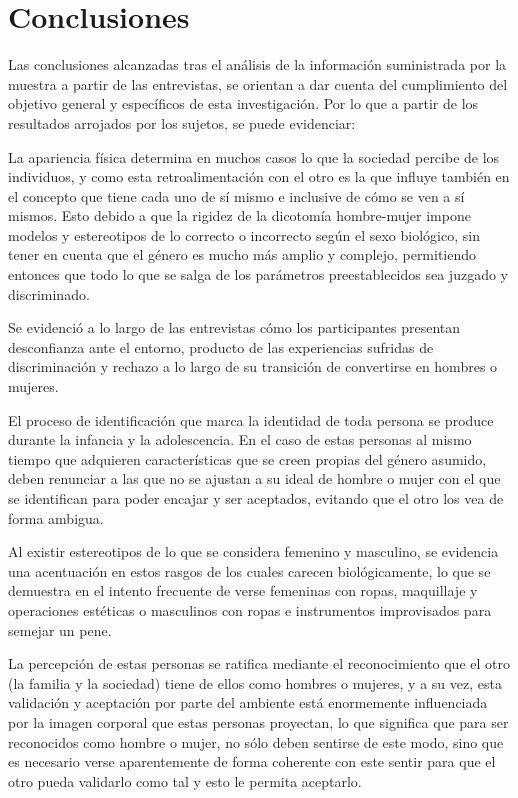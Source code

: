 \chapter{Conclusiones}\label{ch:conclusion}

Las conclusiones alcanzadas tras el análisis de la información suministrada por
la muestra a partir de las entrevistas, se orientan a dar cuenta del
cumplimiento del objetivo general y específicos de esta investigación. Por lo
que a partir de los resultados arrojados por los sujetos, se puede evidenciar:

La apariencia física determina en muchos casos lo que la sociedad percibe de los
individuos, y como esta retroalimentación con el otro es la que influye también
en el concepto que tiene cada uno de sí mismo e inclusive de cómo se ven a sí
mismos. Esto debido a que la rigidez de la dicotomía hombre-mujer impone modelos
y estereotipos de lo correcto o incorrecto según el sexo biológico, sin tener en
cuenta que el género es mucho más amplio y complejo, permitiendo entonces que
todo lo que se salga de los parámetros preestablecidos sea juzgado y
discriminado.

Se evidenció a lo largo de las entrevistas cómo los participantes presentan
desconfianza ante el entorno, producto de las experiencias sufridas de
discriminación y rechazo a lo largo de su transición de convertirse en hombres o
mujeres.

El proceso de identificación que marca la identidad de toda persona se produce
durante la infancia y la adolescencia. En el caso de estas personas al mismo
tiempo que adquieren características que se creen propias del género asumido,
deben renunciar a las que no se ajustan a su ideal de hombre o mujer con el que
se identifican para poder encajar y ser aceptados, evitando que el otro los vea
de forma ambigua.

Al existir estereotipos de lo que se considera femenino y masculino, se
evidencia una acentuación en estos rasgos de los cuales carecen biológicamente,
lo que se demuestra en el intento frecuente de verse femeninas con ropas,
maquillaje y operaciones estéticas o masculinos con ropas e instrumentos
improvisados para semejar un pene.

La percepción de estas personas se ratifica mediante el reconocimiento que el
otro (la familia y la sociedad) tiene de ellos como hombres o mujeres, y a su
vez, esta validación y aceptación por parte del ambiente está enormemente
influenciada por la imagen corporal que estas personas proyectan, lo que
significa que para ser reconocidos como hombre o mujer, no sólo deben sentirse
de este modo, sino que es necesario verse aparentemente de forma coherente con
este sentir para que el otro pueda validarlo como tal y esto le permita
aceptarlo.

